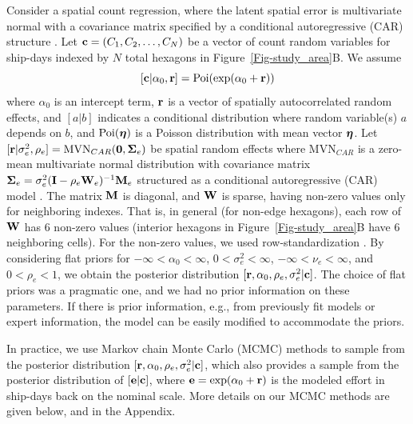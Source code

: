 \documentclass[11pt, titlepage]{article}
\begin{document}
\begin{spacing}{1.9}
\begin{flushleft}
Consider a spatial count regression, where the latent spatial error is multivariate normal with a covariance matrix specified by a conditional autoregressive (CAR) structure \citep[e.g.,][]{VerHoefEtAl2018Spatialautoregressivemodels36}.  Let $\mathbf{c} = (C_{1}, C_{2}, \ldots, C_{N})$ be a vector of count random variables for ship-days indexed by $N$ total hexagons in Figure~\ref{Fig-study_area}B.  We assume
\begin{equation} \label{eq:poireg}
  [\mathbf{c}|\alpha_{0},\mathbf{r}] = \textrm{Poi}(\exp(\alpha_{0} + \mathbf{r}))
\end{equation}
where $\alpha_{0}$ is an intercept term, $\mathbf{r}$ is a vector of spatially autocorrelated random effects, and $[a|b]$ indicates a conditional distribution where random variable(s) $a$ depends on $b$, and $\textrm{Poi}(\mbox{\boldmath $\eta$})$ is a Poisson distribution with mean vector $\mbox{\boldmath $\eta$}$. Let $[\mathbf{r}|\sigma^{2}_{e}, \rho_{e}] = \textrm{MVN}_{CAR}(\mathbf{0},\mbox{\boldmath $\Sigma$}_{e})$ be spatial random effects where $\textrm{MVN}_{CAR}$ is a zero-mean multivariate normal distribution with covariance matrix $\mbox{\boldmath $\Sigma$}_{e} = \sigma^{2}_{e}(\mathbf{I} - \rho_{e}\mathbf{W}_{e})^{-1}\mathbf{M}_{e}$ structured as a conditional autoregressive (CAR) model \citep{Besag1974SpatialInteractionStatistical192}.  The matrix $\mathbf{M}$ is diagonal, and $\mathbf{W}$ is sparse, having non-zero values only for neighboring indexes.  That is, in general (for non-edge hexagons), each row of $\mathbf{W}$ has 6 non-zero values (interior hexagons in Figure~\ref{Fig-study_area}B have 6 neighboring cells).  For the non-zero values, we used row-standardization \citep{VerHoefEtAl2018Spatialautoregressivemodels36}.  By considering flat priors for $-\infty < \alpha_{0} < \infty$, $0 < \sigma^{2}_{e} < \infty$, $-\infty < \nu_{e} < \infty$, and $0 < \rho_{e} < 1$, we obtain the posterior distribution $[\mathbf{r}, \alpha_{0}, \rho_{e}, \sigma^{2}_{e}|\mathbf{c}]$.  The choice of flat priors was a pragmatic one, and we had no prior information on these parameters.  If there is prior information, e.g., from previously fit models or expert information, the model can be easily modified to accommodate the priors.

In practice, we use Markov chain Monte Carlo (MCMC) methods to sample from the posterior distribution $[\mathbf{r}, \alpha_{0}, \rho_{e}, \sigma^{2}_{e}|\mathbf{c}]$, which also provides a sample from the posterior distribution of $[\mathbf{e}|\mathbf{c}]$, where $\mathbf{e} = \exp(\alpha_{0} + \mathbf{r})$ is the modeled effort in ship-days back on the nominal scale.  More details on our MCMC methods are given below, and in the Appendix.


\end{flushleft}
\end{spacing}
\end{document}
